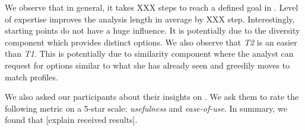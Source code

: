 We observe that in general, it takes XXX steps to reach a defined goal in \framework. Level of expertise improves the analysis length in average by XXX step. Interestingly, starting points do not have a huge influence. It is potentially due to the diversity component which provides distinct options. We also observe that {\em T2} is an easier than {\em T1}. This is potentially due to similarity component where the analyst can request for options similar to what she has already seen and greedily moves to match profiles.

We also asked our participants about their insights on \framework. We ask them to rate the following metric on a 5-star scale: {\em usefulness} and {\em ease-of-use}. In summary, we found that [explain received results].